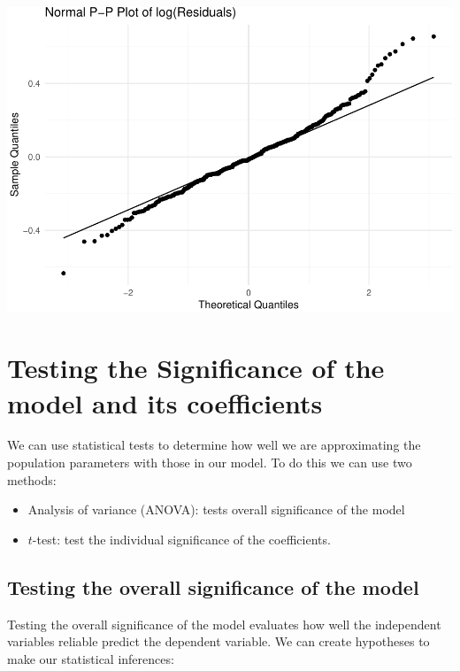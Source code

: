\documentclass[
]{article}
\providecommand{\tightlist}{%
  \setlength{\itemsep}{0pt}\setlength{\parskip}{0pt}}
\begin{document}
\includegraphics{L7_Correlation_and_regression_pdf_files/figure-latex/unnamed-chunk-15-1.pdf}

\hypertarget{testing-the-significance-of-the-model-and-its-coefficients}{%
\section{Testing the Significance of the model and its
coefficients}\label{testing-the-significance-of-the-model-and-its-coefficients}}

We can use statistical tests to determine how well we are approximating
the population parameters with those in our model. To do this we can use
two methods:

\begin{itemize}
\tightlist
\item
  Analysis of variance (ANOVA): tests overall significance of the model
\item
  \(t\)-test: test the individual significance of the coefficients.
\end{itemize}

\hypertarget{testing-the-overall-significance-of-the-model}{%
\subsection{Testing the overall significance of the
model}\label{testing-the-overall-significance-of-the-model}}

Testing the overall significance of the model evaluates how well the
independent variables reliable predict the dependent variable. We can
create hypotheses to make our statistical inferences:
\end{document}
